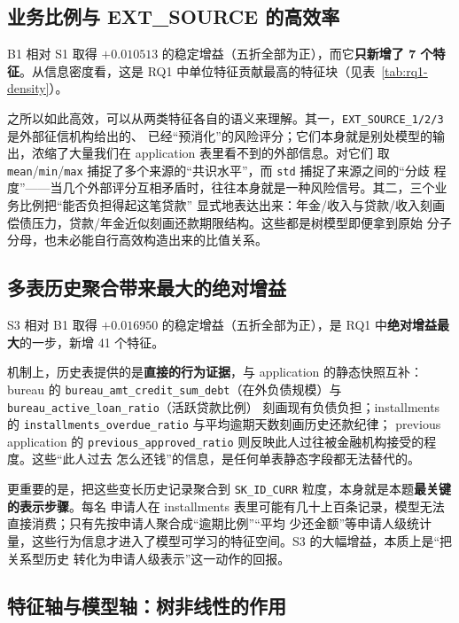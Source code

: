 \documentclass[11pt,UTF8,fontset=windows]{ctexrep}
\begin{document}
\subsection{业务比例与 EXT\_SOURCE 的高效率}

B1 相对 S1 取得 $+0.010513$ 的稳定增益（五折全部为正），而它\textbf{只新增了 7 个特征}。从信息密度看，这是
RQ1 中单位特征贡献最高的特征块（见表~\ref{tab:rq1-density}）。

之所以如此高效，可以从两类特征各自的语义来理解。其一，\texttt{EXT\_SOURCE\_1/2/3} 是外部征信机构给出的、
已经“预消化”的风险评分；它们本身就是别处模型的输出，浓缩了大量我们在 application 表里看不到的外部信息。对它们
取 \texttt{mean}/\texttt{min}/\texttt{max} 捕捉了多个来源的“共识水平”，而 \texttt{std} 捕捉了来源之间的“分歧
程度”——当几个外部评分互相矛盾时，往往本身就是一种风险信号。其二，三个业务比例把“能否负担得起这笔贷款”
显式地表达出来：年金/收入与贷款/收入刻画偿债压力，贷款/年金近似刻画还款期限结构。这些都是树模型即便拿到原始
分子分母，也未必能自行高效构造出来的比值关系。

\subsection{多表历史聚合带来最大的绝对增益}

S3 相对 B1 取得 $+0.016950$ 的稳定增益（五折全部为正），是 RQ1 中\textbf{绝对增益最大}的一步，新增 41 个特征。

机制上，历史表提供的是\textbf{直接的行为证据}，与 application 的静态快照互补：bureau 的
\texttt{bureau\_amt\_credit\_sum\_debt}（在外负债规模）与 \texttt{bureau\_active\_loan\_ratio}（活跃贷款比例）
刻画现有负债负担；installments 的 \texttt{installments\_overdue\_ratio} 与平均逾期天数刻画历史还款纪律；
previous application 的 \texttt{previous\_approved\_ratio} 则反映此人过往被金融机构接受的程度。这些“此人过去
怎么还钱”的信息，是任何单表静态字段都无法替代的。

更重要的是，把这些变长历史记录聚合到 \texttt{SK\_ID\_CURR} 粒度，本身就是本题\textbf{最关键的表示步骤}。每名
申请人在 installments 表里可能有几十上百条记录，模型无法直接消费；只有先按申请人聚合成“逾期比例”“平均
少还金额”等申请人级统计量，这些行为信息才进入了模型可学习的特征空间。S3 的大幅增益，本质上是“把关系型历史
转化为申请人级表示”这一动作的回报。

\subsection{特征轴与模型轴：树非线性的作用}
\end{document}
